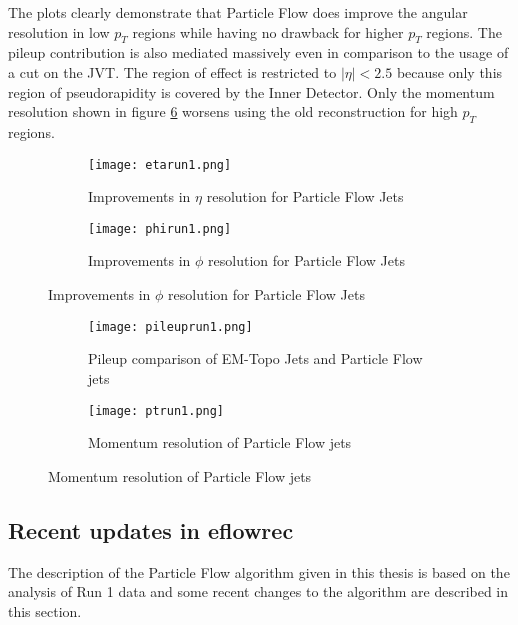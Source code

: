 The plots clearly demonstrate that Particle Flow does improve the angular resolution in low $p_T$ regions while having no drawback for higher $p_T$ regions. The pileup contribution is also mediated massively even in comparison to the usage of a cut on the JVT. The region of effect is restricted to $|\eta|<\num{2.5}$ because only this region of pseudorapidity is covered by the Inner Detector. Only the momentum resolution shown in figure \ref{fig:ptrun1} worsens using the old reconstruction for high $p_T$ regions.
\begin{figure}[h]
  \centering
  \begin{subfigure}[b]{0.5\figwidth}
  \texttt{[image: etarun1.png]}
  \caption[Improvements in $\eta$ resolution for Particle Flow Jets]{Improvements in $\eta$ resolution for Particle Flow Jets \cite{pflow16}}
  \label{fig:etarun1}
  \end{subfigure}
  \begin{subfigure}[b]{0.5\figwidth}
  \texttt{[image: phirun1.png]}
  \caption[Improvements in $\phi$ resolution for Particle Flow Jets]{Improvements in $\phi$ resolution for Particle Flow Jets \cite{pflow16}}
  \label{fig:phirun1}
  \end{subfigure}
\end{figure}

\begin{figure}[h]
  \centering
  \begin{subfigure}[b]{0.5\figwidth}
  \texttt{[image: pileuprun1.png]}
  \caption[Pileup comparison of EM-Topo Jets and Particle Flow jets]{Pileup comparison of EM-Topo Jets and Particle Flow jets \cite{pflow16}}
  \label{fig:pileuprun1}
  \end{subfigure}
\begin{subfigure}[b]{0.5\figwidth}
\texttt{[image: ptrun1.png]}
\caption[Momentum resolution of Particle Flow]{Momentum resolution of Particle Flow jets \cite{pflow16}}
\label{fig:ptrun1}
\end{subfigure}
\end{figure}



\subsection{Recent updates in eflowrec}

The description of the Particle Flow algorithm given in this thesis is based on the analysis of Run 1 data and some recent changes to the algorithm are described in this section.


